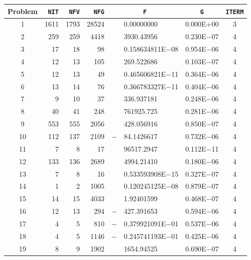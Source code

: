 \documentclass{esub2acm}
\begin{document}
\begin{table}
\footnotesize
\centering
\begin{tabular}{c|rrrr@{}lcc} \hline
Problem\rule[-2pt]{0pt}{12pt} & {\tt NIT} & {\tt NFV} & {\tt NFG} & \multicolumn{2}{c}{\tt F} & {\tt G} & {\tt ITERM} \\ \hline
1\rule[-2pt]{0pt}{12pt} &   1611    &   1793    &   28524   &       &   0.00000000  &   0.000E+00   &   3   \\
2   &   259 &   259 &   4418    &       &   3930.43956  &   0.230E$-$07 &   4   \\
3   &   17  &   18  &   98  &       &   0.158634811E$-$08   &   0.954E$-$06 &   4   \\
4   &   12  &   13  &   105 &       &   269.522686  &   0.103E$-$07 &   4   \\
5   &   12  &   13  &   49  &       &   0.465606821E$-$11   &   0.364E$-$06 &   4   \\
6   &   13  &   14  &   76  &       &   0.366783327E$-$11   &   0.404E$-$06 &   4   \\
7   &   9   &   10  &   37  &       &   336.937181  &   0.248E$-$06 &   4   \\
8   &   40  &   41  &   248 &       &   761925.725  &   0.281E$-$06 &   4   \\
9   &   553 &   555 &   2056    &       &   428.056916  &   0.850E$-$07 &   4   \\
10  &   112 &   137 &   2109    &   $-$ &   84.1426617  &   0.732E$-$06 &   4   \\
11  &   7   &   8   &   17  &       &   96517.2947  &   0.112E$-$11 &   4   \\
12  &   133 &   136 &   2689    &       &   4994.21410  &   0.180E$-$06 &   4   \\
13  &   7   &   8   &   16  &       &   0.533593908E$-$15   &   0.327E$-$07 &   4   \\
14  &   1   &   2   &   1005    &       &   0.120245125E$-$08   &   0.879E$-$07 &   4   \\
15  &   14  &   15  &   4033    &       &   1.92401599  &   0.468E$-$07 &   4   \\
16  &   12  &   13  &   294 &   $-$ &   427.391653  &   0.594E$-$06 &   4   \\
17  &   4   &   5   &   810 &   $-$ &   0.379921091E$-$01   &   0.537E$-$06 &   4   \\
18  &   4   &   5   &   1146    &   $-$ &   0.245741193E$-$01   &   0.425E$-$06 &   4   \\
19  &   8   &   9   &   1902    &       &   1654.94525  &   0.690E$-$07 &   4   \\

\end{tabular}
\end{table}
\end{document}
